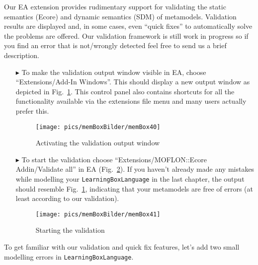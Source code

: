 \visHeader

Our EA extension provides rudimentary support for validating the static semantics (Ecore) and dynamic semantics (SDM) of metamodels.
Validation results are displayed and, in some cases, even ``quick fixes'' to automatically solve the problems are offered.
Our validation framework is still work in progress so if you find an error that is not/wrongly detected feel free to send us a brief description.

\begin{enumerate}
\item[$\blacktriangleright$] To make the validation output window visible in EA, choose ``Extensions/\-Add-In Windows''.
This should display a new output window as depicted in Fig.~\ref{fig:validation_output}. This control panel also contains shortcuts for all the functionality available via the extensions file menu and many users actually prefer this.

\begin{figure}[htbp]
	\centering
  \texttt{[image: pics/memBoxBilder/memBox40]}
	\caption{Activating the validation output window}
	\label{fig:validation_output}
\end{figure}
\FloatBarrier

\item[$\blacktriangleright$] To start the validation choose ``Extensions/\-MOFLON::Ecore Addin/\-Validate all'' in EA (Fig.~\ref{fig:validation_menu}).
If you haven't already made any mistakes while modelling your \texttt{LearningBoxLanguage} in the last chapter, the output should resemble Fig.~\ref{fig:validation_output}, indicating that your metamodels are free of errors (at least according to our validation).

\begin{figure}[htbp]
	\centering
  \texttt{[image: pics/memBoxBilder/memBox41]}
	\caption{Starting the validation}
	\label{fig:validation_menu}
\end{figure}
\FloatBarrier
\end{enumerate}


To get familiar with our validation and quick fix features, let's add two small modelling errors in \texttt{LearningBoxLanguage}.

